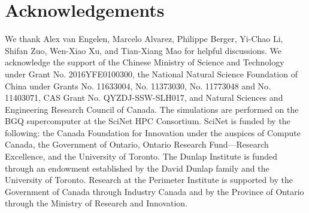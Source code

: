 \documentclass[prd,superscriptaddress,floatfix,notitlepage,nofootinbib,reprint]{revtex4-1}
\begin{document}
\section*{Acknowledgements}
We thank Alex van Engelen, Marcelo Alvarez, Philippe Berger, 
Yi-Chao Li, Shifan Zuo, Wen-Xiao Xu, and Tian-Xiang Mao for helpful discussions.
We acknowledge the support of the Chinese Ministry of Science and Technology
under Grant No. 2016YFE0100300, the National Natural Science Foundation of 
China under Grants No. 11633004, No. 11373030, No. 11773048 and No. 11403071, 
CAS Grant No. QYZDJ-SSW-SLH017, and Natural Sciences and Engineering Research 
Council of Canada. 
The simulations are performed on the BGQ supercomputer at the SciNet HPC 
Consortium. SciNet is funded by the following: the Canada Foundation for 
Innovation under 
the auspices of Compute Canada, the Government of Ontario, Ontario Research 
Fund---Research Excellence, and the University of Toronto.
The Dunlap Institute is funded through an endowment established by the David Dunlap family and the University of Toronto.
Research at the Perimeter Institute is supported by the Government of Canada 
through Industry Canada and by the Province of Ontario through the Ministry of 
Research and Innovation.



\end{document}
